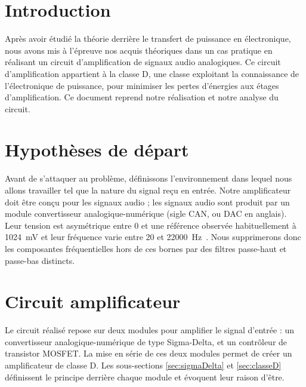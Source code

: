 \documentclass[10pt, oneside, a4paper]{article}
\begin{document}
\tableofcontents
\newpage

\section*{Introduction}
Après avoir étudié la théorie derrière le transfert de puissance en électronique,
nous avons mis à l'épreuve nos acquis théoriques dans un cas pratique en réalisant un circuit d'amplification de signaux audio analogiques.
Ce circuit d'amplification appartient à la classe D, une classe exploitant la connaissance de l'électronique de puissance, pour minimiser les pertes d'énergies aux étages d'amplification.
Ce document reprend notre réalisation et notre analyse du circuit.


\section{Hypothèses de départ}
\label{sec:hypothese}
Avant de s'attaquer au problème, définissons l'environnement dans lequel nous allons travailler tel que la nature du signal reçu en entrée.
Notre amplificateur doit être conçu pour les signaux audio ;
les signaux audio sont produit par un module convertisseur analogique-numérique (sigle CAN, ou DAC en anglais).
Leur tension est asymétrique entre \num{0} et une référence observée habituellement à \SI{1024}{\milli\volt} et leur fréquence varie entre \num{20} et \SI{22000}{\hertz}~\cite{heffner2007hearing}.
Nous supprimerons donc les composantes fréquentielles hors de ces bornes par des filtres passe-haut et passe-bas distincts.


\section{Circuit amplificateur}
Le circuit réalisé repose sur deux modules pour amplifier le signal d'entrée :
un convertisseur analogique-numérique de type Sigma-Delta, et un contrôleur de transistor MOSFET.
La mise en série de ces deux modules permet de créer un amplificateur de classe D.
Les sous-sections \ref{sec:sigmaDelta} et \ref{sec:classeD} définissent le principe derrière chaque module et évoquent leur raison d'être.
\end{document}

